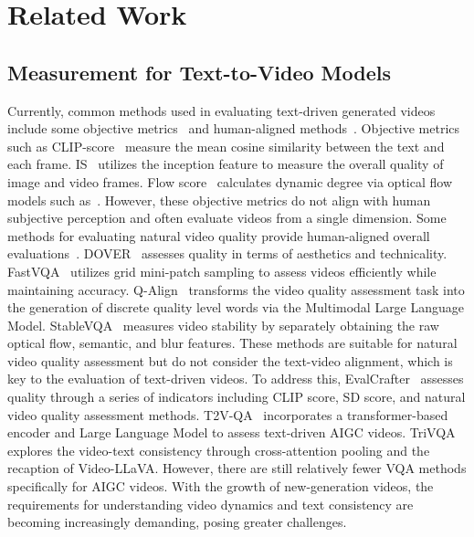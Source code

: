 \section{Related Work}
\subsection{Measurement for Text-to-Video Models}
Currently, common methods used in evaluating text-driven generated videos include some objective metrics~\cite{clip,fvd,is} and human-aligned methods~\cite{pickscore,trivqa,t2vqa}.
Objective metrics such as CLIP-score~\cite{clip} measure the mean cosine similarity between the text and each frame. IS~\cite{is} utilizes the inception feature to measure the overall quality of image and video frames. Flow score~\cite{vbench} calculates dynamic degree via optical flow models such as~\cite{raft,skflow}.
However, these objective metrics do not align with human subjective perception and often evaluate videos from a single dimension. Some methods for evaluating natural video quality provide human-aligned overall evaluations~\cite{dover,fastvqa,stablevqa}. 
DOVER~\cite{dover} assesses quality in terms of aesthetics and technicality. 
FastVQA~\cite{fastvqa} utilizes grid mini-patch sampling to assess videos efficiently while maintaining accuracy.
Q-Align~\cite{wu2023qalign} transforms the video quality assessment task into the generation of discrete quality level words via the Multimodal Large Language Model.
StableVQA~\cite{stablevideo} measures video stability by separately obtaining the raw optical flow, semantic, and blur features.
These methods are suitable for natural video quality assessment but do not consider the text-video alignment, which is key to the evaluation of text-driven videos.
To address this, EvalCrafter~\cite{evalcrafter} assesses quality through a series of indicators including CLIP score, SD score, and natural video quality assessment methods. 
T2V-QA~\cite{t2vqa} incorporates a transformer-based encoder and Large Language Model to assess text-driven AIGC videos.
TriVQA~\cite{trivqa} explores the video-text consistency through cross-attention pooling and the recaption of Video-LLaVA. 
However, there are still relatively fewer VQA methods specifically for AIGC videos. With the growth of new-generation videos, the requirements for understanding video dynamics and text consistency are becoming increasingly demanding, posing greater challenges.



